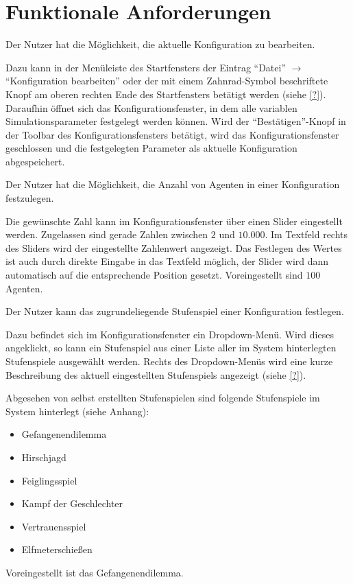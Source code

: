 \documentclass[parskip=full,11pt]{scrartcl}
\begin{document}
\pagebreak

\section{Funktionale Anforderungen}

Der Nutzer hat die Möglichkeit, die aktuelle Konfiguration zu bearbeiten.

Dazu kann in der Menüleiste des Startfensters der Eintrag \enquote{Datei} \(\rightarrow\) \enquote{Konfiguration bearbeiten} oder der mit einem Zahnrad-Symbol beschriftete Knopf am oberen rechten Ende des Startfensters betätigt werden (siehe \cref{?}). Daraufhin öffnet sich das Konfigurationsfenster, in dem alle variablen Simulationsparameter festgelegt werden können. Wird der \enquote{Bestätigen}-Knopf in der Toolbar des Konfigurationsfensters betätigt, wird das Konfigurationsfenster geschlossen und die festgelegten Parameter als aktuelle Konfiguration abgespeichert.

Der Nutzer hat die Möglichkeit, die Anzahl von Agenten in einer Konfiguration festzulegen.

Die gewünschte Zahl kann im Konfigurationsfenster über einen Slider eingestellt werden. Zugelassen sind gerade Zahlen zwischen \(2\) und \(10.000\). Im Textfeld rechts des Sliders wird der eingestellte Zahlenwert angezeigt. Das Festlegen des Wertes ist auch durch direkte Eingabe in das Textfeld möglich, der Slider wird dann automatisch auf die entsprechende Position gesetzt. Voreingestellt sind \(100\) Agenten.

Der Nutzer kann das zugrundeliegende Stufenspiel einer Konfiguration festlegen.

Dazu befindet sich im Konfigurationsfenster ein Dropdown-Menü. Wird dieses angeklickt, so kann ein Stufenspiel aus einer Liste aller im System hinterlegten Stufenspiele ausgewählt werden. Rechts des Dropdown-Menüs wird eine kurze Beschreibung des aktuell eingestellten Stufenspiels angezeigt (siehe \cref{?}).

Abgesehen von selbst erstellten Stufenspielen sind folgende Stufenspiele im System hinterlegt (siehe Anhang):
\begin{itemize} \itemsep -10pt
\item Gefangenendilemma
\item Hirschjagd
\item Feiglingsspiel
\item Kampf der Geschlechter
\item Vertrauensspiel
\item Elfmeterschießen
\end{itemize}
Voreingestellt ist das Gefangenendilemma.
\end{document}
